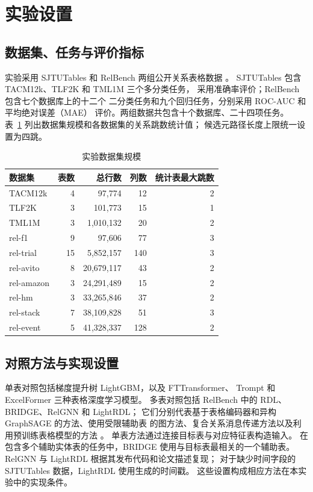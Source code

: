
\section{实验设置}
\label{sec:metartl-setup}

\subsection{数据集、任务与评价指标}

实验采用 SJTUTables 和 RelBench 两组公开关系表格数据
\cite{li2024rllm,robinson2024relbench}。
SJTUTables 包含 TACM12k、TLF2K 和 TML1M 三个多分类任务，
采用准确率评价；RelBench 包含七个数据库上的十二个
二分类任务和九个回归任务，分别采用 ROC-AUC 和平均绝对误差（MAE）
评价。两组数据共包含十个数据库、二十四项任务。
表~\ref{tab:metartl-datasets} 列出数据集规模和各数据集的关系跳数统计值；
候选元路径长度上限统一设置为四跳。

\begin{table}[htbp]
  \centering
  \caption{实验数据集规模}
  \label{tab:metartl-datasets}
  \begin{tabular}{lrrrr}
    \toprule
    数据集 & 表数 & 总行数 & 列数 & 统计表最大跳数 \\
    \midrule
    TACM12k    & 4  & 97,774     & 12  & 2 \\
    TLF2K      & 3  & 101,773    & 15  & 1 \\
    TML1M      & 3  & 1,010,132  & 20  & 2 \\
    rel-f1     & 9  & 97,606     & 77  & 3 \\
    rel-trial  & 15 & 5,852,157  & 140 & 3 \\
    rel-avito  & 8  & 20,679,117 & 43  & 2 \\
    rel-amazon & 3  & 24,291,489 & 15  & 2 \\
    rel-hm     & 3  & 33,265,846 & 37  & 2 \\
    rel-stack  & 7  & 38,109,828 & 51  & 3 \\
    rel-event  & 5  & 41,328,337 & 128 & 2 \\
    \bottomrule
  \end{tabular}
\end{table}

\subsection{对照方法与实现设置}

单表对照包括梯度提升树 LightGBM\cite{ke2017lightgbm}，以及
FTTransformer\cite{gorishniy2021tabular}、
Trompt\cite{chen2023trompt} 和
ExcelFormer\cite{chen2024excelformer} 三种表格深度学习模型。
多表对照包括 RelBench 中的 RDL、BRIDGE、RelGNN 和 LightRDL；
它们分别代表基于表格编码器和异构 GraphSAGE 的方法、使用受限辅助表
的图方法、复合关系消息传递方法以及利用预训练表格模型的方法
\cite{fey2024rdl,li2024rllm,chen2025relgnn,lachi2025lightrdl}。
单表方法通过连接目标表与对应特征表构造输入。
在包含多个辅助实体表的任务中，BRIDGE 使用与目标表最相关的一个辅助表。
RelGNN 与 LightRDL 根据其发布代码和论文描述复现；
对于缺少时间字段的 SJTUTables 数据，LightRDL 使用生成的时间戳。
这些设置构成相应方法在本实验中的实现条件。

